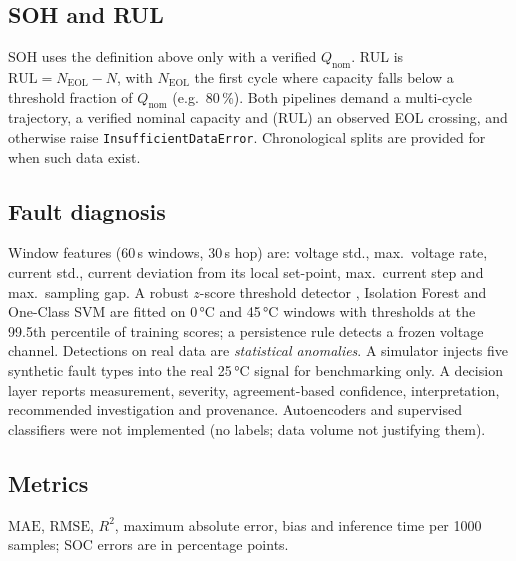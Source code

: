 \subsection{SOH and RUL}
SOH uses the definition above only with a verified $Q_{\mathrm{nom}}$. RUL is $\mathrm{RUL}=N_{\mathrm{EOL}}-N$, with $N_{\mathrm{EOL}}$ the first cycle where capacity falls below a threshold fraction of $Q_{\mathrm{nom}}$ (e.g.\ 80\,\%). Both pipelines demand a multi-cycle trajectory, a verified nominal capacity and (RUL) an observed EOL crossing, and otherwise raise \texttt{InsufficientDataError}. Chronological splits are provided for when such data exist.

\subsection{Fault diagnosis}
Window features (60\,s windows, 30\,s hop) are: voltage std., max.\ voltage rate, current std., current deviation from its local set-point, max.\ current step and max.\ sampling gap. A robust $z$-score threshold detector \cite{pedregosa2011}, Isolation Forest \cite{liu2008if} and One-Class SVM \cite{scholkopf2001} are fitted on 0\,°C and 45\,°C windows with thresholds at the 99.5th percentile of training scores; a persistence rule detects a frozen voltage channel. Detections on real data are \emph{statistical anomalies}. A simulator injects five synthetic fault types into the real 25\,°C signal for benchmarking only. A decision layer reports measurement, severity, agreement-based confidence, interpretation, recommended investigation and provenance. Autoencoders and supervised classifiers were not implemented (no labels; data volume not justifying them).

\subsection{Metrics}
$\mathrm{MAE}$, $\mathrm{RMSE}$, $R^2$, maximum absolute error, bias and inference time per 1000 samples; SOC errors are in percentage points.
